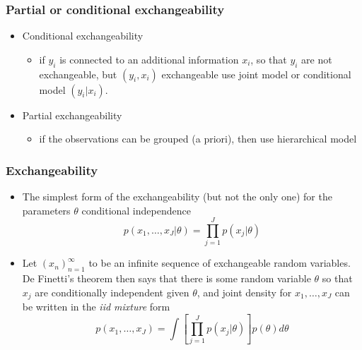 \documentclass[10pt]{beamer}
\begin{document}
\begin{frame}

\frametitle{Partial or conditional exchangeability}

\begin{itemize}
  \item Conditional exchangeability
    \begin{itemize}
    \item if $y_i$ is connected to an additional information $x_i$, so
      that $y_i$ are not exchangeable, but $(y_i,x_i)$ exchangeable
      use joint model or conditional model $(y_i|x_i)$.
    \end{itemize}
  \item<2-> Partial exchangeability
    \begin{itemize}
    \item if the observations can be grouped (a priori), then use
      hierarchical model
    \end{itemize}
\end{itemize}
\end{frame}

\begin{frame}

\frametitle{Exchangeability}

  \begin{itemize}
  \item The simplest form of the exchangeability (but not the only
    one) for the parameters $\theta$ conditional independence
    \begin{equation*}
      p(x_1,\ldots,x_J|\theta)=\prod_{j=1}^J p(x_j|\theta)
    \end{equation*}
  \item<2-> Let $(x_n)_{n=1}^{\infty}$ to be an infinite sequence of
    exchangeable random variables. De Finetti's theorem then says that
    there is some random variable $\theta$ so that $x_j$ are
    conditionally independent given $\theta$, and joint density for
    $x_1,\ldots,x_J$ can be written in the \textit{iid mixture} form
    \begin{equation*}
      p(x_1,\ldots,x_J)=\int \left[\prod_{j=1}^J p(x_j|\theta)\right]p(\theta)d\theta
    \end{equation*}

   \end{itemize}
\end{frame}
\end{document}

